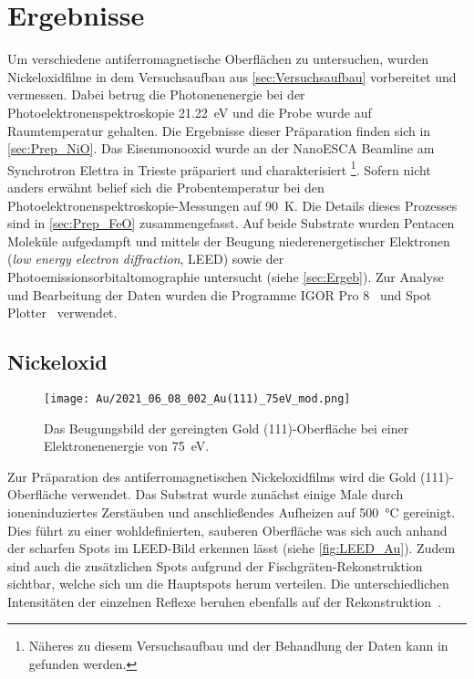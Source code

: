 \chapter{Ergebnisse}
    Um verschiedene antiferromagnetische Oberflächen zu untersuchen, wurden Nickeloxidfilme in dem Versuchsaufbau aus \autoref{sec:Versuchsaufbau} vorbereitet und vermessen.
    Dabei betrug die Photonenenergie bei der Photoelektronenspektroskopie \SI{21.22}{\electronvolt} und die Probe wurde auf Raumtemperatur gehalten.
    Die Ergebnisse dieser Präparation finden sich in \autoref{sec:Prep_NiO}.
    Das Eisenmonooxid wurde an der NanoESCA Beamline am Synchrotron Elettra in Trieste präpariert und charakterisiert \footnote{Näheres zu diesem Versuchsaufbau und der Behandlung der Daten kann in~\cite{ma-DJ} gefunden werden.}.
    Sofern nicht anders erwähnt belief sich die Probentemperatur bei den Photoelektronenspektroskopie-Messungen auf \SI{90}{\kelvin}.
    Die Details dieses Prozesses sind in \autoref{sec:Prep_FeO} zusammengefasst.
    Auf beide Substrate wurden Pentacen Moleküle aufgedampft und mittels der Beugung niederenergetischer Elektronen (\textit{low energy electron diffraction}, LEED) sowie der Photoemissionsorbitaltomographie untersucht (siehe \autoref{sec:Ergeb}).
    Zur Analyse und Bearbeitung der Daten wurden die Programme IGOR Pro 8~\cite{IGOR} und Spot Plotter~\cite{SpotPlotter} verwendet. %

    \section{Nickeloxid} \label{sec:Prep_NiO}
        \begin{figure}
            \centering
            \texttt{[image: Au/2021\_06\_08\_002\_Au(111)\_75eV\_mod.png]}            
            \caption{Das Beugungsbild der gereingten Gold (111)-Oberfläche bei einer Elektronenenergie von \SI{75}{\electronvolt}.}
            \label{fig:LEED_Au}
        \end{figure}
        Zur Präparation des antiferromagnetischen Nickeloxidfilms wird die Gold (111)-Oberfläche verwendet.
        Das Substrat wurde zunächst einige Male durch ioneninduziertes Zerstäuben und anschließendes Aufheizen auf \SI{500}{\celsius} gereinigt.
        Dies führt zu einer wohldefinierten, sauberen Oberfläche was sich auch anhand der scharfen Spots im LEED-Bild erkennen lässt (siehe \autoref{fig:LEED_Au}).
        Zudem sind auch die zusätzlichen Spots aufgrund der Fischgräten-Rekonstruktion sichtbar, welche sich um die Hauptspots herum verteilen.
        Die unterschiedlichen Intensitäten der einzelnen Reflexe beruhen ebenfalls auf der Rekonstruktion~\cite{haag_epitaxial_2016}.

